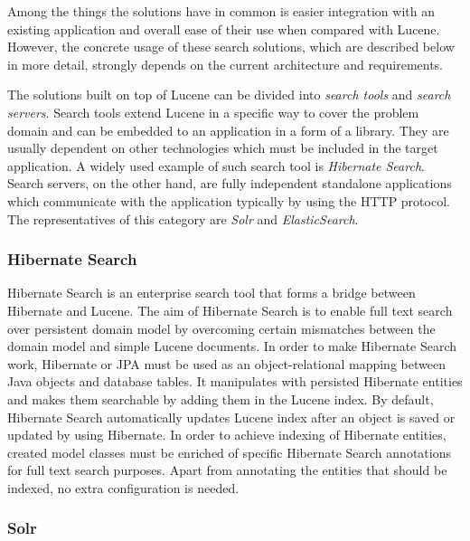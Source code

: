 Among the things the solutions have in common is easier integration with an existing application and overall ease of their use when compared with Lucene. 
However, the concrete usage of these search solutions, which are described below in more detail, strongly depends on the current architecture and requirements.

The solutions built on top of Lucene can be divided into \textit{search tools} and \textit{search servers}. 
Search tools extend Lucene in a specific way to cover the problem domain and can be embedded to an application in a form of a library. 
They are usually dependent on other technologies which must be included in the target application. 
A widely used example of such search tool is \textit{Hibernate Search}.
Search servers, on the other hand, are fully independent standalone applications which communicate with the application typically by using the HTTP protocol. The representatives of this category are \textit{Solr} and \textit{ElasticSearch}.

\subsubsection{Hibernate Search}

Hibernate Search \cite{HibernateSearchHome} is an enterprise search tool that forms a bridge between Hibernate and Lucene. 
The aim of Hibernate Search is to enable full text search over persistent domain model by overcoming certain mismatches between the domain model and simple Lucene documents.
In order to make Hibernate Search work, Hibernate or JPA must be used as an object-relational mapping between Java objects and database tables. 
It manipulates with persisted Hibernate entities and makes them searchable by adding them in the Lucene index. 
By default, Hibernate Search automatically updates Lucene index after an object is saved or updated by using Hibernate.
In order to achieve indexing of Hibernate entities, created model classes must be enriched of specific Hibernate Search annotations for full text search purposes.
Apart from annotating the entities that should be indexed, no extra configuration is needed. 

\subsubsection{Solr}

